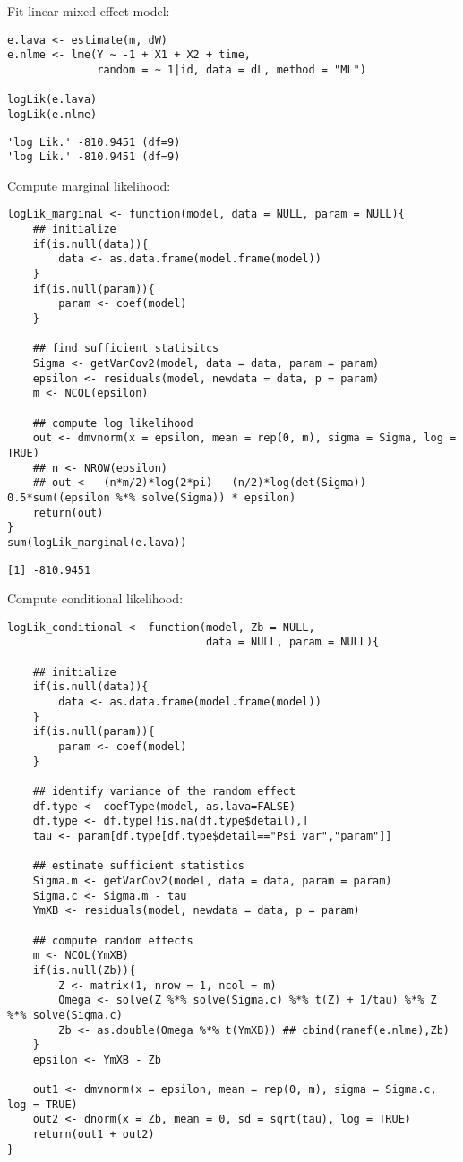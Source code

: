 \documentclass[12pt]{article}
\begin{document}
Fit linear mixed effect model:
\lstset{language=r,label= ,caption= ,captionpos=b,numbers=none}
\begin{lstlisting}
e.lava <- estimate(m, dW)
e.nlme <- lme(Y ~ -1 + X1 + X2 + time,
			  random = ~ 1|id, data = dL, method = "ML")

logLik(e.lava)
logLik(e.nlme)
\end{lstlisting}

\begin{verbatim}
'log Lik.' -810.9451 (df=9)
'log Lik.' -810.9451 (df=9)
\end{verbatim}

\clearpage

Compute marginal likelihood:
\lstset{language=r,label= ,caption= ,captionpos=b,numbers=none}
\begin{lstlisting}
logLik_marginal <- function(model, data = NULL, param = NULL){
	## initialize
	if(is.null(data)){
		data <- as.data.frame(model.frame(model))
	}
	if(is.null(param)){
		param <- coef(model)
	}

	## find sufficient statisitcs
	Sigma <- getVarCov2(model, data = data, param = param)
	epsilon <- residuals(model, newdata = data, p = param)
	m <- NCOL(epsilon)

	## compute log likelihood
	out <- dmvnorm(x = epsilon, mean = rep(0, m), sigma = Sigma, log = TRUE)
	## n <- NROW(epsilon)
	## out <- -(n*m/2)*log(2*pi) - (n/2)*log(det(Sigma)) - 0.5*sum((epsilon %*% solve(Sigma)) * epsilon)
	return(out)
}
sum(logLik_marginal(e.lava))
\end{lstlisting}

\begin{verbatim}
[1] -810.9451
\end{verbatim}

\clearpage

Compute conditional likelihood:
\lstset{language=r,label= ,caption= ,captionpos=b,numbers=none}
\begin{lstlisting}
logLik_conditional <- function(model, Zb = NULL, 
							   data = NULL, param = NULL){

	## initialize
	if(is.null(data)){
		data <- as.data.frame(model.frame(model))
	}
	if(is.null(param)){
		param <- coef(model)
	}

	## identify variance of the random effect
	df.type <- coefType(model, as.lava=FALSE)
	df.type <- df.type[!is.na(df.type$detail),]
	tau <- param[df.type[df.type$detail=="Psi_var","param"]]

	## estimate sufficient statistics
	Sigma.m <- getVarCov2(model, data = data, param = param)
	Sigma.c <- Sigma.m - tau
	YmXB <- residuals(model, newdata = data, p = param)

	## compute random effects
	m <- NCOL(YmXB)
	if(is.null(Zb)){
		Z <- matrix(1, nrow = 1, ncol = m)
		Omega <- solve(Z %*% solve(Sigma.c) %*% t(Z) + 1/tau) %*% Z %*% solve(Sigma.c)
		Zb <- as.double(Omega %*% t(YmXB)) ## cbind(ranef(e.nlme),Zb)
	}
	epsilon <- YmXB - Zb

	out1 <- dmvnorm(x = epsilon, mean = rep(0, m), sigma = Sigma.c, log = TRUE)
	out2 <- dnorm(x = Zb, mean = 0, sd = sqrt(tau), log = TRUE)
	return(out1 + out2)
}
\end{lstlisting}
\end{document}

